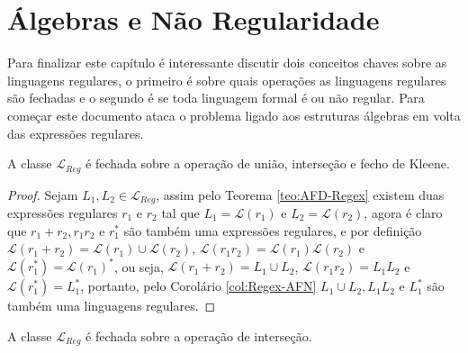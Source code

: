 \section{Álgebras e Não Regularidade}\label{sec:FechoLinguagensRegulares}

Para finalizar este capítulo é interessante discutir dois conceitos chaves sobre as linguagens regulares, o primeiro é sobre quais operações as linguagens regulares são fechadas e o segundo é se toda linguagem formal é ou não regular. Para começar este documento ataca o problema ligado aos estruturas álgebras em volta das expressões regulares.

\begin{teorema}\label{teo:FechoRegA}
	A classe $\mathcal{L}_{Reg}$ é fechada sobre a operação de união, interseção e fecho de Kleene.
\end{teorema}

\begin{proof}
	Sejam $L_1, L_2 \in \mathcal{L}_{Reg}$, assim pelo Teorema \ref{teo:AFD-Regex} existem duas expressões regulares $r_1$ e $r_2$ tal que $L_1 = \mathcal{L}(r_1)$ e $L_2 = \mathcal{L}(r_2)$, agora é claro que $r_1 + r_2, r_1r_2$ e $r_1^*$ são também uma expressões regulares, e por definição $\mathcal{L}(r_1 + r_2) = \mathcal{L}(r_1) \cup \mathcal{L}(r_2)$, $\mathcal{L}(r_1r_2) = \mathcal{L}(r_1)\mathcal{L}(r_2)$ e $\mathcal{L}(r_1^*) = \mathcal{L}(r_1)^*$, ou seja, $\mathcal{L}(r_1 + r_2) = L_1 \cup L_2$, $\mathcal{L}(r_1r_2) = L_1L_2$ e $\mathcal{L}(r_1^*) = L_1^*$, portanto, pelo Corolário \ref{col:Regex-AFN} $L_1 \cup L_2, L_1L_2$ e $L_1^*$ são também uma linguagens regulares.
\end{proof}

\begin{teorema}\label{teo:FechoRegB}
	A classe $\mathcal{L}_{Reg}$ é fechada sobre a operação de interseção.
\end{teorema}

